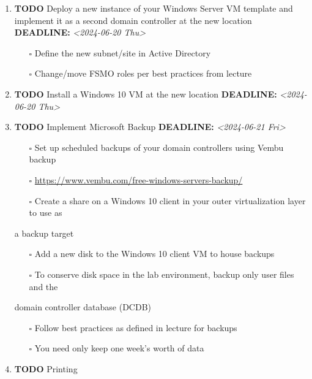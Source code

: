 \documentclass[letterpaper]{article}
\begin{document}
\begin{enumerate}
\begin{itemize}
\begin{itemize}
\end{itemize}
\end{itemize}
\item {\bfseries\sffamily TODO} Deploy a new instance of your Windows Server VM template and implement it as a second domain controller at the new location
\label{sec:orge445e1e}
\noindent\textbf{DEADLINE:} \textit{<2024-06-20 Thu>}\\[0pt]
\begin{itemize}
\item[{$\square$}] Define the new subnet/site in Active Directory
\item[{$\square$}] Change/move FSMO roles per best practices from lecture
\end{itemize}
\item {\bfseries\sffamily TODO} Install a Windows 10 VM at the new location
\label{sec:org175d85f}
\noindent\textbf{DEADLINE:} \textit{<2024-06-20 Thu>}\\[0pt]
\item {\bfseries\sffamily TODO} Implement Microsoft Backup
\label{sec:org922c717}
\noindent\textbf{DEADLINE:} \textit{<2024-06-21 Fri>}\\[0pt]
\begin{itemize}
\item[{$\square$}] Set up scheduled backups of your domain controllers using Vembu backup
\item[{$\square$}] \url{https://www.vembu.com/free-windows-servers-backup/}
\item[{$\square$}] Create a share on a Windows 10 client in your outer virtualization layer to use as
\end{itemize}
a backup target
\begin{itemize}
\item[{$\square$}] Add a new disk to the Windows 10 client VM to house backups
\end{itemize}
\begin{itemize}
\item[{$\square$}] To conserve disk space in the lab environment, backup only user files and the
\end{itemize}
domain controller database (DCDB)
\begin{itemize}
\item[{$\square$}] Follow best practices as defined in lecture for backups
\item[{$\square$}] You need only keep one week’s worth of data
\end{itemize}
\item {\bfseries\sffamily TODO} Printing

\end{enumerate}
\end{document}

